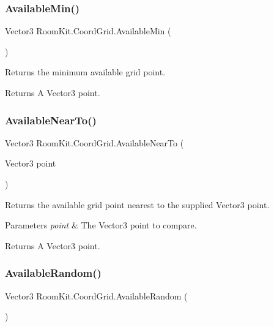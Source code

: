 \subsubsection{\texorpdfstring{Available\+Min()}{AvailableMin()}}
{\footnotesize\ttfamily Vector3 Room\+Kit.\+Coord\+Grid.\+Available\+Min (\begin{DoxyParamCaption}{ }\end{DoxyParamCaption})}



Returns the minimum available grid point. 

\begin{DoxyReturn}{Returns}
A Vector3 point. 
\end{DoxyReturn}
\mbox{\label{class_room_kit_1_1_coord_grid_a8f23bb3e3de818686337ab83304a576d}} 
\subsubsection{\texorpdfstring{Available\+Near\+To()}{AvailableNearTo()}}
{\footnotesize\ttfamily Vector3 Room\+Kit.\+Coord\+Grid.\+Available\+Near\+To (\begin{DoxyParamCaption}\item[{Vector3}]{point }\end{DoxyParamCaption})}



Returns the available grid point nearest to the supplied Vector3 point. 


\begin{DoxyParams}{Parameters}
{\em point} & The Vector3 point to compare.\\
\hline
\end{DoxyParams}
\begin{DoxyReturn}{Returns}
A Vector3 point. 
\end{DoxyReturn}
\mbox{\label{class_room_kit_1_1_coord_grid_afa27190e6d89efd3554f6cb95bf4c3e3}} 
\subsubsection{\texorpdfstring{Available\+Random()}{AvailableRandom()}}
{\footnotesize\ttfamily Vector3 Room\+Kit.\+Coord\+Grid.\+Available\+Random (\begin{DoxyParamCaption}{ }\end{DoxyParamCaption})}



